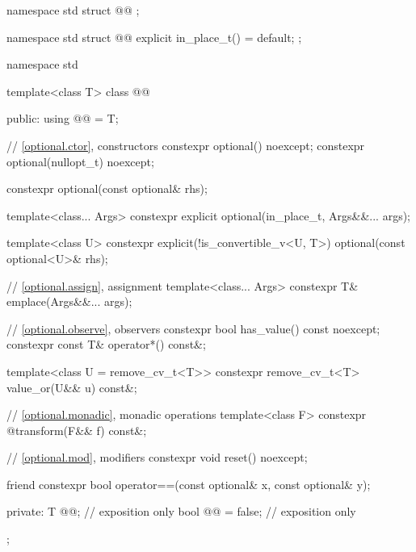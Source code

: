 \begin{codeblock}
namespace std {
  struct @@ {};
}
\end{codeblock}

\begin{codeblock}
namespace std {
  struct @@ {
    explicit in_place_t() = default;
  };
}
\end{codeblock}

\begin{codeblock}
namespace std {
  template<class T>
  class @@ {
  public:
    using @@ = T;

    // \ref{optional.ctor}, constructors
    constexpr optional() noexcept;
    constexpr optional(nullopt_t) noexcept;

    constexpr optional(const optional& rhs);

    template<class... Args> constexpr explicit optional(in_place_t, Args&&... args);

    template<class U>
    constexpr explicit(!is_convertible_v<U, T>) optional(const optional<U>& rhs);

    // \ref{optional.assign}, assignment
    template<class... Args> constexpr T& emplace(Args&&... args);

    // \ref{optional.observe}, observers
    constexpr bool has_value() const noexcept;
    constexpr const T& operator*() const&;

    template<class U = remove_cv_t<T>> constexpr remove_cv_t<T> value_or(U&& u) const&;

    // \ref{optional.monadic}, monadic operations
    template<class F> constexpr @\seebelow@ transform(F&& f) const&;

    // \ref{optional.mod}, modifiers
    constexpr void reset() noexcept;

    friend constexpr bool operator==(const optional& x, const optional& y);

  private:
    T @@;              // exposition only
    bool @@ = false; // exposition only
  };
}
\end{codeblock}
